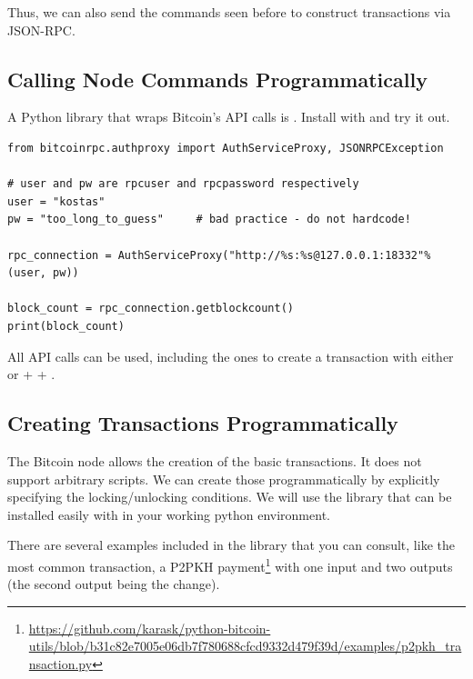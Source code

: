 Thus, we can also send the commands seen before to construct transactions via JSON-RPC.


\subsection*{Calling Node Commands Programmatically}

A Python library that wraps Bitcoin’s API calls is . Install with  and try it out.

\vspace{1em}
\begin{lstlisting}[style=Python]
from bitcoinrpc.authproxy import AuthServiceProxy, JSONRPCException

# user and pw are rpcuser and rpcpassword respectively
user = "kostas"
pw = "too_long_to_guess"     # bad practice - do not hardcode!

rpc_connection = AuthServiceProxy("http://%s:%s@127.0.0.1:18332"%(user, pw))

block_count = rpc_connection.getblockcount()
print(block_count)
\end{lstlisting}
\vspace{1em}

All API calls can be used, including the ones to create a transaction with either  or  +  + .



\subsection*{Creating Transactions Programmatically}

The Bitcoin node allows the creation of the basic transactions. It does not support arbitrary scripts. We can create those programmatically by explicitly specifying the locking/unlocking conditions. We will use the  library that can be installed easily with  in your working python environment.

There are several examples included in the library that you can consult, like the most common transaction, a P2PKH payment\footnote{\url{https://github.com/karask/python-bitcoin-utils/blob/b31c82e7005e06db7f780688cfcd9332d479f39d/examples/p2pkh_transaction.py}} with one input and two outputs (the second output being the change).

